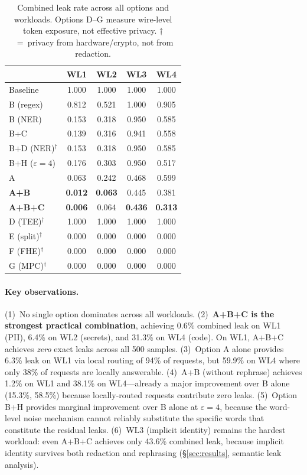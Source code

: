 \documentclass[11pt,a4paper]{article}
\begin{document}
\begin{table}[h]
\centering
\small
\caption{Combined leak rate across all options and workloads.
  Options D--G measure wire-level token exposure, not effective privacy.
  $\dagger$~=~privacy from hardware/crypto, not from redaction.}
\label{tab:all-options}
\begin{tabular}{lcccc}
\toprule
 & WL1 & WL2 & WL3 & WL4 \\
\midrule
Baseline       & 1.000 & 1.000 & 1.000 & 1.000 \\
B (regex)      & 0.812 & 0.521 & 1.000 & 0.905 \\
B (NER)        & 0.153 & 0.318 & 0.950 & 0.585 \\
B+C            & 0.139 & 0.316 & 0.941 & 0.558 \\
B+D (NER)$^\dagger$ & 0.153 & 0.318 & 0.950 & 0.585 \\
B+H ($\varepsilon\!=\!4$) & 0.176 & 0.303 & 0.950 & 0.517 \\
A              & 0.063 & 0.242 & 0.468 & 0.599 \\
\textbf{A+B}   & \textbf{0.012} & \textbf{0.063} & 0.445 & 0.381 \\
\textbf{A+B+C} & \textbf{0.006} & 0.064 & \textbf{0.436} & \textbf{0.313} \\
D (TEE)$^\dagger$  & 1.000 & 1.000 & 1.000 & 1.000 \\
E (split)$^\dagger$  & 0.000 & 0.000 & 0.000 & 0.000 \\
F (FHE)$^\dagger$  & 0.000 & 0.000 & 0.000 & 0.000 \\
G (MPC)$^\dagger$  & 0.000 & 0.000 & 0.000 & 0.000 \\
\bottomrule
\end{tabular}
\end{table}

\paragraph{Key observations.}
(1)~No single option dominates across all workloads.
(2)~\textbf{A+B+C is the strongest practical combination},
achieving 0.6\% combined leak on WL1 (PII), 6.4\% on WL2
(secrets), and 31.3\% on WL4 (code).  On WL1, A+B+C achieves
\emph{zero} exact leaks across all 500 samples.
(3)~Option A alone provides 6.3\% leak on WL1 via local
routing of 94\% of requests, but 59.9\% on WL4 where only
38\% of requests are locally answerable.
(4)~A+B (without rephrase) achieves 1.2\% on WL1 and 38.1\%
on WL4---already a major improvement over B alone (15.3\%,
58.5\%) because locally-routed requests contribute zero leaks.
(5)~Option B+H provides marginal improvement over B alone
at $\varepsilon = 4$, because the word-level noise mechanism
cannot reliably substitute the specific words that constitute
the residual leaks.
(6)~WL3 (implicit identity) remains the hardest workload:
even A+B+C achieves only 43.6\% combined leak, because
implicit identity survives both redaction and rephrasing
(\S\ref{sec:results}, semantic leak analysis).
\end{document}
